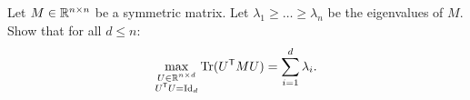 \documentclass[11pt,nocut]{article}
\begin{document}
\vspace{5mm}

\begin{problem}[$\star$]
	Let $M \in \mathbb{R}^{n \times n}$ be a symmetric matrix. Let $\lambda_1 \geq \dots \geq \lambda_n$ be the eigenvalues of $M$. Show that for all $d \leq n$:
	$$
	\max_{\substack{U \in \mathbb{R}^{n\times d} \\ U^{{\sf T}} U = {{\rm Id}}_d}} {{\rm Tr}}(U^{{\sf T}} M U) = \sum_{i=1}^d \lambda_i.
	$$
\end{problem}
\vspace{1cm}
\centerline{}

%
%
\end{document}
